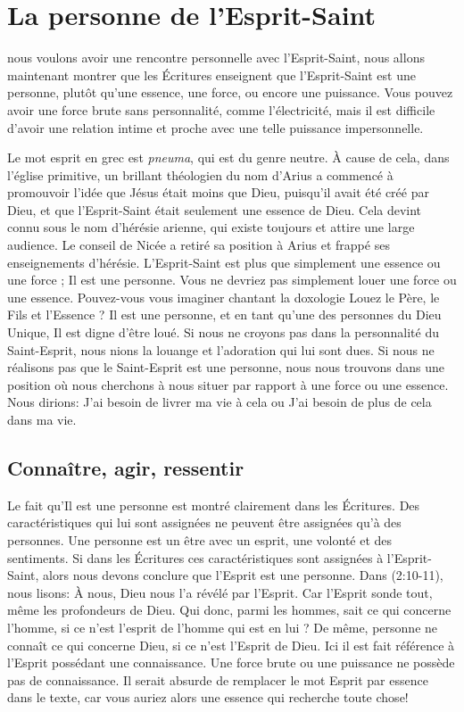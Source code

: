\chapter{La personne de l'Esprit-Saint}

 nous voulons avoir une rencontre personnelle avec
 l'Esprit-Saint, nous allons maintenant montrer que les Écritures enseignent
 que l'Esprit-Saint est une personne, plutôt qu'une essence, une force, ou
 encore une puissance. Vous pouvez avoir une force brute sans personnalité,
 comme l'électricité, mais il est difficile d'avoir une relation intime et
 proche avec une telle puissance impersonnelle.

Le mot \og esprit \fg{} en grec est \emph{pneuma}, qui est du genre neutre.
 À cause de cela, dans l'église primitive, un brillant théologien du nom
 d'Arius a commencé à promouvoir l'idée que Jésus était moins que Dieu,
 puisqu'il avait été créé par Dieu, et que l'Esprit-Saint était seulement
 une \og essence \fg{} de Dieu. Cela devint connu sous le nom d'hérésie
 arienne, qui existe toujours et attire une large audience. Le conseil de
 Nicée a retiré sa position à Arius et frappé ses enseignements d'hérésie.
 L'Esprit-Saint est plus que simplement une essence ou une force ; Il est
 une personne. Vous ne devriez pas simplement louer une force ou une essence.
 Pouvez-vous vous imaginer chantant la doxologie \og Louez le Père, le Fils
 et l'Essence \fg{} ? Il est une personne, et en tant qu'une des personnes
 du Dieu Unique, Il est digne d'être loué. Si nous ne croyons pas dans la
 personnalité du Saint-Esprit, nous nions la louange et l'adoration qui lui
 sont dues. Si nous ne réalisons pas que le Saint-Esprit est une personne,
 nous nous trouvons dans une position où nous cherchons à nous situer par
 rapport à une force ou une essence. Nous dirions\space: \og J'ai besoin de livrer
 ma vie à cela \fg{} ou \og J'ai besoin de plus de cela dans ma vie.\fg


\section*{Connaître, agir, ressentir}

Le fait qu'Il est une personne est montré clairement dans les Écritures.
 Des caractéristiques qui lui sont assignées ne peuvent être assignées
 qu'à des personnes. Une personne est un être avec un esprit, une volonté et
 des sentiments. Si dans les Écritures ces caractéristiques sont assignées à
 l'Esprit-Saint, alors nous devons conclure que l'Esprit est une personne.
 Dans (2:10-11), nous lisons\space: \og À nous, Dieu nous l'a
 révélé par l'Esprit. Car l'Esprit sonde tout, même les profondeurs de Dieu.
 Qui donc, parmi les hommes, sait ce qui concerne l'homme, si ce n'est
 l'esprit de l'homme qui est en lui ? De même, personne ne connaît ce qui
 concerne Dieu, si ce n'est l'Esprit de Dieu. \fg{} Ici il est fait référence
 à l'Esprit possédant une connaissance. Une force brute ou une puissance ne
 possède pas de connaissance. Il serait absurde de remplacer le mot
 \og Esprit \fg{} par \og essence \fg{} dans le texte, car vous auriez alors
 une \og essence \fg{} qui recherche toute chose!

